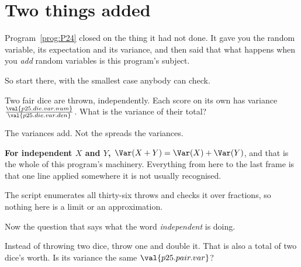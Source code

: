 \section{Two things added}
\label{sec:P25-adding}

\begin{fr}
Program~\ref{prog:P24} closed on the thing it had not done. It gave you the
random variable, its expectation and its variance, and then said that what
happens when you \emph{add} random variables is this program's subject.

So start there, with the smallest case anybody can check.

Two fair dice are thrown, independently. Each score on its own has variance
$\frac{\val{p25.die.var.num}}{\val{p25.die.var.den}}$. What is the variance of
their total?
\dotline
\nextframe
\end{fr}

\begin{fr}

The variances add. Not the spreads \dash{} the variances.

\textbf{For independent $X$ and $Y$, $\Var(X + Y) = \Var(X) + \Var(Y)$}, and
that is the whole of this program's machinery. Everything from here to the
last frame is that one line applied somewhere it is not usually recognised.

The script enumerates all thirty-six throws and checks it over fractions, so
nothing here is a limit or an approximation.
\end{fr}

\begin{fr}
Now the question that says what the word \emph{independent} is doing.

Instead of throwing two dice, throw one and double it. That is also a total of
two dice's worth. Is its variance the same
$\val{p25.pair.var}$?
\dotline
\nextframe
\end{fr}

